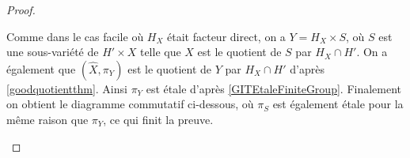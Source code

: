 \begin{proof}
	\begin{center}
	\end{center}

Comme dans le cas facile où $H_X$ était facteur direct, on a $Y=H_X\times S$, où $S$ est une sous-variété de $H'\times X$ telle que $X$ est le quotient de $S$ par $H_X\cap H'$. On a également que $(\widehat{X}, \pi_Y)$ est le quotient de $Y$ par $H_X\cap H'$ d'après \ref{goodquotientthm}. Ainsi $\pi_Y$ est étale d'après \ref{GITEtaleFiniteGroup}. Finalement on obtient le diagramme commutatif ci-dessous, où $\pi_S$ est également étale pour la même raison que $\pi_Y$, ce qui finit la preuve.

	\begin{center}
	\end{center}


\end{proof}

